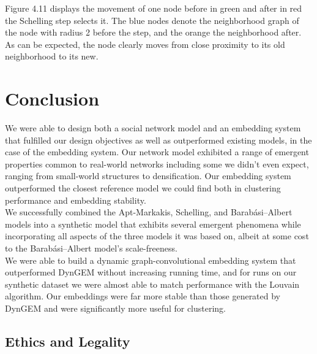 \documentclass[12pt,twoside]{report}
\begin{document}
\begin{figure}[H]
\begin{center}
\begin{minipage}{0.45\linewidth}
\end{minipage}
\end{center}
\end{figure}

Figure 4.11 displays the movement of one node before in green and after in red the Schelling step selects it. The blue nodes denote the neighborhood graph of the node with radius 2 before the step, and the orange the neighborhood after. As can be expected, the node clearly moves from close proximity to its old neighborhood to its new. \\ 

\chapter{Conclusion}

We were able to design both a social network model and an embedding system that fulfilled our design objectives as well as outperformed existing models, in the case of the embedding system. Our network model exhibited a range of emergent properties common to real-world networks including some we didn't even expect, ranging from small-world structures to densification. Our embedding system outperformed the closest reference model we could find both in clustering performance and embedding stability. \\

We successfully combined the Apt-Markakis, Schelling, and Barabási–Albert models into a synthetic model that exhibits several emergent phenomena while incorporating all aspects of the three models it was based on, albeit at some cost to the Barabási–Albert model's scale-freeness. \\

We were able to build a dynamic graph-convolutional embedding system that outperformed DynGEM without increasing running time, and for runs on our synthetic dataset we were almost able to match performance with the Louvain algorithm. Our embeddings were far more stable than those generated by DynGEM and were significantly more useful for clustering. \\

\section{Ethics and Legality}
\end{document}
